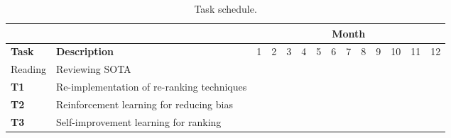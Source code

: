 %
\begin{table}[t!]
	\centering
	\scriptsize	
	\caption{Task schedule.}
	\begin{tabular}{|p{0.80cm}|p{4.80cm}|p{0.40cm}|p{0.40cm}|p{0.40cm}|p{0.40cm}|p{0.40cm}|p{0.40cm}|p{0.40cm}|p{0.40cm}|p{0.40cm}|p{0.40cm}|p{0.40cm}|p{0.40cm}|}  \hline
		& & \multicolumn{12}{c|}{\textbf{Month}} \\ \hline
		\textbf{Task} & \textbf{Description} & 1 & 2 & 3 & 4 & 5 & 6  & 7 & 8 & 9 &  10 & 11 & 12 \\ \hline
		Reading & Reviewing SOTA & \cellcolor{lightgray} & \cellcolor{lightgray} &  &  &  &   &  &  &  &   & \cellcolor{lightgray} &  \\ \hline
		\textbf{T1} & Re-implementation of re-ranking techniques &  & \cellcolor{lightgray} & \cellcolor{lightgray} &   &   &   &  &  &  &   &  &  \\ \hline
		\textbf{T2} & Reinforcement learning for reducing bias &  &  & \cellcolor{lightgray} & \cellcolor{lightgray} &  \cellcolor{lightgray} &  \cellcolor{lightgray}  &  &  &  &   &  &  \\ \hline
		\textbf{T3} & Self-improvement learning for ranking &  &  &  & \cellcolor{lightgray} &  \cellcolor{lightgray} &  \cellcolor{lightgray}  & \cellcolor{lightgray} &  &  &   &  &  \\ \hline

\end{tabular}
\end{table}
